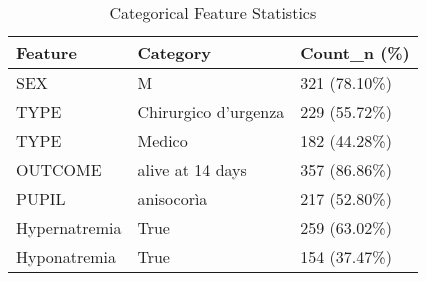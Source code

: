 \begin{table}[h!]
    \centering
    \small %
    \begin{tabular}{lll}
    \hline
    \textbf{Feature} & \textbf{Category} & \textbf{Count\_n (\%)} \\
    \hline
    SEX & M & 321 (78.10\%) \\
    TYPE & Chirurgico d’urgenza & 229 (55.72\%) \\
    TYPE & Medico & 182 (44.28\%) \\
    OUTCOME & alive at 14 days & 357 (86.86\%) \\
    PUPIL & anisocorìa & 217 (52.80\%) \\
    Hypernatremia & True & 259 (63.02\%) \\ 
    Hyponatremia & True & 154 (37.47\%) \\
    \hline
    \end{tabular}
    \caption{Categorical Feature Statistics}
    \label{tab:categorical_features}
\end{table}

